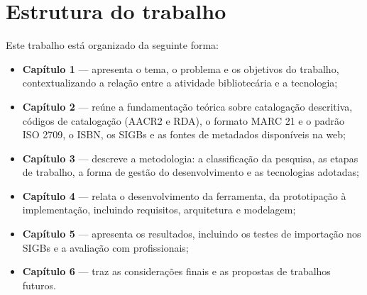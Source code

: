 \section{Estrutura do trabalho}
\label{sec:estrutura}

Este trabalho está organizado da seguinte forma:

\begin{itemize}
    \item \textbf{Capítulo 1} --- apresenta o tema, o problema e os objetivos do trabalho, contextualizando a relação entre a atividade bibliotecária e a tecnologia;
    \item \textbf{Capítulo 2} --- reúne a fundamentação teórica sobre catalogação descritiva, códigos de catalogação (AACR2 e RDA), o formato MARC 21 e o padrão ISO 2709, o ISBN, os SIGBs e as fontes de metadados disponíveis na web;
    \item \textbf{Capítulo 3} --- descreve a metodologia: a classificação da pesquisa, as etapas de trabalho, a forma de gestão do desenvolvimento e as tecnologias adotadas;
    \item \textbf{Capítulo 4} --- relata o desenvolvimento da ferramenta, da prototipação à implementação, incluindo requisitos, arquitetura e modelagem;
    \item \textbf{Capítulo 5} --- apresenta os resultados, incluindo os testes de importação nos SIGBs e a avaliação com profissionais;
    \item \textbf{Capítulo 6} --- traz as considerações finais e as propostas de trabalhos futuros.
\end{itemize}
